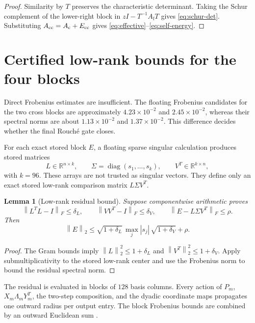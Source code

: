 \documentclass[11pt]{article}
\newtheorem{lemma}[theorem]{Lemma}
\theoremstyle{definition}
\theoremstyle{remark}
\newcommand{\Id}{I}
\newcommand{\Ac}{A_{\mathrm c}}
\newcommand{\Af}{A_{\mathrm f}}
\newcommand{\norm}[1]{\left\lVert #1\right\rVert}
\begin{document}
\begin{proof}
Similarity by \(T\) preserves the characteristic determinant.  Taking the
Schur complement of the lower-right block in
\(z\Id-T^{-1}\Af T\) gives \eqref{eq:schur-det}.  Substituting
\(A_{\rm cc}=\Ac+E_{\rm cc}\) gives
\eqref{eq:effective}--\eqref{eq:self-energy}.
\end{proof}

\section{Certified low-rank bounds for the four blocks}
\label{sec:block-certificate}

Direct Frobenius estimates are insufficient.  The floating Frobenius
candidates for the two cross blocks are approximately \(4.23\times10^{-2}\)
and \(2.45\times10^{-2}\), whereas their spectral norms are about
\(1.13\times10^{-2}\) and \(1.37\times10^{-2}\).  This difference decides
whether the final Rouch\'e gate closes.

For each exact stored block \(E\), a floating sparse singular calculation
produces stored matrices
\[
 L\in\mathbb R^{n\times k},\qquad
 \Sigma=\operatorname{diag}(s_1,\ldots,s_k),\qquad
 V^T\in\mathbb R^{k\times n},
\]
with \(k=96\).  These arrays are not trusted as singular vectors.  They define
only an exact stored low-rank comparison matrix \(L\Sigma V^T\).

\begin{lemma}[Low-rank residual bound]
\label{lem:low-rank}
Suppose componentwise arithmetic proves
\[
 \norm{L^TL-\Id}_F\le\delta_L,\qquad
 \norm{VV^T-\Id}_F\le\delta_V,\qquad
 \norm{E-L\Sigma V^T}_F\le\rho.
\]
Then
\begin{equation}
 \norm{E}_2
 \le
 \sqrt{1+\delta_L}\,\max_j|s_j|\,
 \sqrt{1+\delta_V}+\rho.
 \label{eq:low-rank-bound}
\end{equation}
\end{lemma}

\begin{proof}
The Gram bounds imply
\(\norm{L}_2^2\le1+\delta_L\) and
\(\norm{V^T}_2^2\le1+\delta_V\).  Apply submultiplicativity to the stored
low-rank center and use the Frobenius norm to bound the residual spectral norm.
\end{proof}

The residual is evaluated in blocks of \(128\) basis columns.  Every action of
\(P_m\), \(X_m\Lambda_mY_m^T\), the two-step composition, and the dyadic
coordinate maps propagates one outward radius per output entry.  The block
Frobenius bounds are combined by an outward Euclidean sum
\citep{Higham2002,WangOutwardCode2026}.
\end{document}
